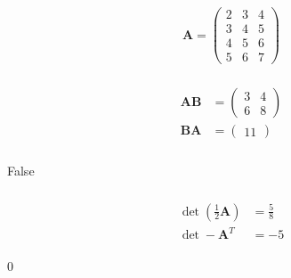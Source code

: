 \documentclass{article}
\begin{document}
\[\mathbf{A} = \begin{pmatrix}
    2 & 3 & 4 \\
    3 & 4 & 5 \\
    4 & 5 & 6 \\
    5 & 6 & 7
  \end{pmatrix}\]

\setcounter{subsubsection}{2}
\subsubsection{}

\begin{align*}
  \mathbf{A B} & = \begin{pmatrix}
                     3 & 4 \\
                     6 & 8
                   \end{pmatrix} \\
  \mathbf{B A} & = \begin{pmatrix}
                     11
                   \end{pmatrix}
\end{align*}

\setcounter{subsubsection}{4}
\subsubsection{}

False

\setcounter{subsubsection}{6}
\subsubsection{}

\begin{align*}
  \det \left( \frac{1}{2} \mathbf{A} \right) & = \frac{5}{8} \\
  \det -\mathbf{A}^T                         & = -5
\end{align*}

\setcounter{subsubsection}{8}
\subsubsection{}

$0$

\setcounter{subsubsection}{10}
\subsubsection{}
\end{document}
